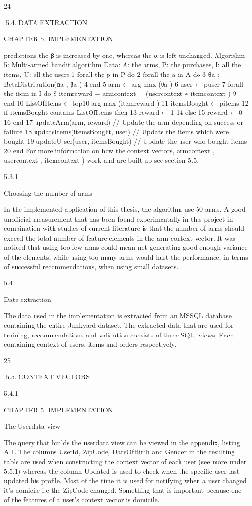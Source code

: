 24

5.4. DATA EXTRACTION

CHAPTER 5. IMPLEMENTATION

predictions the β is increased by one, whereas the α is left unchanged.
Algorithm 5: Multi-armed bandit algorithm
Data: A: the arms, P: the purchases, I: all the items, U: all the users
1 forall the p in P do
2
forall the a in A do
3
θa ← BetaDistribution(αa , βa )
4
end
5
arm ← arg max (θa )
6
user ← puser
7
forall the item in I do
8
itemreward = armcontext · (usercontext ∗ itemcontext )
9
end
10
ListOfItems ← top10 arg max (itemreward )
11
itemsBought ← pitems
12
if itemsBought contains ListOfItems then
13
reward ← 1
14
else
15
reward ← 0
16
end
17
updateArm(arm, reward) // Update the arm depending on success or failure
18
updateItems(itemsBought, user) // Update the items which were bought
19
updateU ser(user, itemsBought) // Update the user who bought items
20 end
For more information on how the context vectors, armcontext , usercontext , itemcontext )
work and are built up see section 5.5.

5.3.1

Choosing the number of arms

In the implemented application of this thesis, the algorithm use 50 arms. A good unofficial measurement that has been found experimentally in this project in combination
with studies of current literature is that the number of arms should exceed the total
number of feature-elements in the arm context vector. It was noticed that using too few
arms could mean not generating good enough variance of the elements, while using too
many arms would hurt the performance, in terms of successful recommendations, when
using small datasets.

5.4

Data extraction

The data used in the implementation is extracted from an MSSQL database containing
the entire Junkyard dataset. The extracted data that are used for training, recommendations and validation consists of three SQL- views. Each containing context of users,
items and orders respectively.

25

5.5. CONTEXT VECTORS

5.4.1

CHAPTER 5. IMPLEMENTATION

The Userdata view

The query that builds the userdata view can be viewed in the appendix, listing A.1. The
columns UserId, ZipCode, DateOfBirth and Gender in the resulting table are used when
constructing the context vector of each user (see more under 5.5.1) whereas the column
Updated is used to check when the specific user last updated his profile. Most of the
time it is used for notifying when a user changed it’s domicile i.e the ZipCode changed.
Something that is important because one of the features of a user’s context vector is
domicile.


